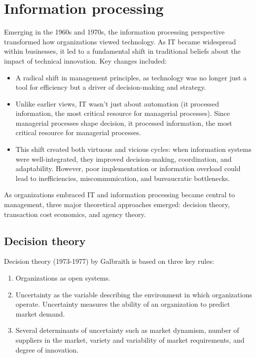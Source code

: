 \section{Information processing}

Emerging in the 1960s and 1970s, the information processing perspective transformed how organizations viewed technology. 
As IT became widespread within businesses, it led to a fundamental shift in traditional beliefs about the impact of technical innovation.
Key changes included:
\begin{itemize}
    \item A radical shift in management principles, as technology was no longer just a tool for efficiency but a driver of decision-making and strategy.
    \item Unlike earlier views, IT wasn't just about automation (it processed information, the most critical resource for managerial processes).
        Since managerial processes shape decision, it processed information, the most critical resource for managerial processes.
    \item This shift created both virtuous and vicious cycles: when information systems were well-integrated, they improved decision-making, coordination, and adaptability.
        However, poor implementation or information overload could lead to inefficiencies, miscommunication, and bureaucratic bottlenecks.
\end{itemize}
As organizations embraced IT and information processing became central to management, three major theoretical approaches emerged: decision theory, transaction cost economics, and agency theory.

\subsection{Decision theory}
Decision theory (1973-1977) by Galbraith is based on three key rules: 
\begin{enumerate}
    \item Organizations as open systems.
    \item Uncertainty as the variable describing the environment in which organizations operate. 
        Uncertainty measures the ability of an organization to predict market demand. 
    \item Several determinants of uncertainty such as market dynamism, number of suppliers in the market, variety and variability of market requirements, and degree of innovation. 
\end{enumerate}
